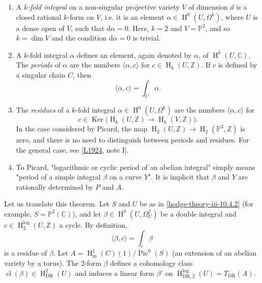     
 \begin{enumerate}
      
 \item[(a)]
        A \emph{\(k\)-fold integral} on a non-singular projective variety \(V\) of dimension \(d\) is a closed rational \(k\)-form on \(V\), i.e. it is an element \(\alpha \in \operatorname {H}^0(U,\Omega ^k)\), where \(U\) is a dense open of \(V\), such that \(\mathrm {d}\alpha =0\).
        Here, \(k=2\) and \(V=\mathbb {P}^2\), and so \(k=\dim  V\) and the condition \(\mathrm {d}\alpha =0\) is trivial.
      


      
 \item[(b)]
        A \(k\)-fold integral \(\alpha \) defines an element, again denoted by \(\alpha \), of \(\operatorname {H}^k(U,\mathbb {C})\).
        The \emph{periods} of \(\alpha \) are the numbers \(\langle \alpha ,c\rangle \) for \(c\in \operatorname {H}_k(U,\mathbb {Z})\).
        If \(c\) is defined by a singular chain \(C\), then
        \[           \langle \alpha ,c\rangle            = \int _C\alpha .         \]
      


      
 \item[(c)]
        The \emph{residues} of a \(k\)-fold integral \(\alpha \in \operatorname {H}^0(U,\Omega ^k)\) are the numbers \(\langle \alpha ,c\rangle \) for
        \[           c\in \operatorname {Ker}\big ( \operatorname {H}_k(U,\mathbb {Z})\to \operatorname {H}_k(V,\mathbb {Z}) \big ).         \]
        In the case considered by Picard, the map \(\operatorname {H}_2(U,\mathbb {Z})\to \operatorname {H}_2(\mathbb {P}^3,\mathbb {Z})\) is zero, and there is no need to distinguish between periods and residues.
        For the general case, see [\hyperref[L1924]{L1924}, note I].
      


      
 \item[(d)]
        To Picard, "logarithmic or cyclic period of an abelian integral" simply means "period of a simple integral \(\beta \) on a curve \(Y\)".
        It is implicit that \(\beta \) and \(Y\) are rationally determined by \(P\) and \(A\).
      

    \end{enumerate}\label{hodge-theory-iii-10.4.4}\par{}Let us translate this theorem.
    Let \(S\) and \(U\) be as in \cref{hodge-theory-iii-10.4.2} (for example, \(S=\mathbb {P}^2(\mathbb {C})\)), and let \(\beta \in \operatorname {H}^0(U,\Omega _U^2)\) be a double integral and \(c\in \operatorname {H}_2^{\log }(U,\mathbb {Z})\) a cycle.
    By definition,
    \[       \langle \beta ,c\rangle        = \int _c\beta      \]
    is a residue of \(\beta \).
    Let \(A=\operatorname {H}_\mathrm {m}^1(C)(1)/\operatorname {Pic}^0(S)\) (an extension of an abelian variety by a torus).
    The 2-form \(\beta \) defines a cohomology class \(\operatorname {cl}(\beta )\in \operatorname {H}_\mathrm {DR}^2(U)\) and induces a linear form \(\beta '\) on \(\operatorname {H}_{\mathrm {DR},2}^{\log }(U)=T_\mathrm {DR}(A)\).
    

